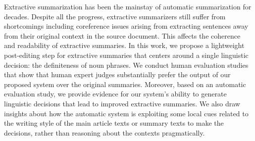 Extractive summarization has been the mainstay of automatic summarization for decades. Despite all the progress, extractive summarizers still suffer from shortcomings including coreference issues arising from extracting sentences away from their original context in the source document. This affects the coherence and readability of extractive summaries. In this work, we propose a lightweight post-editing step for extractive summaries that centers around a single linguistic decision: the definiteness of noun phrases. We conduct human evaluation studies that show that human expert judges substantially prefer the output of our proposed system over the original summaries. Moreover, based on an automatic evaluation study, we provide evidence for our system's ability to generate linguistic decisions that lead to improved extractive summaries. We also draw insights about how the automatic system is exploiting some local cues related to the writing style of the main article texts or summary texts to make the decisions, rather than reasoning about the contexts pragmatically.
